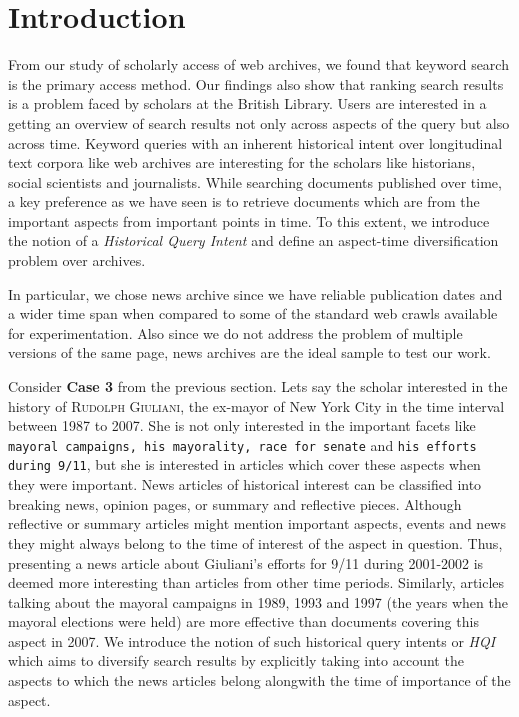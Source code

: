 \section{Introduction}


From our study of scholarly access of web archives, we found that keyword search is the primary access method. Our findings also show that ranking search results is a problem faced by scholars at the British Library. Users are interested in a getting an overview of search results not only across aspects of the query but also across time. Keyword queries with an inherent historical intent over longitudinal text corpora like web archives are interesting for the scholars like historians, social scientists and journalists. While searching documents published over time, a key preference as we have seen is to retrieve documents which are from the important aspects from important points in time. To this extent, we introduce the notion of a \emph{Historical Query Intent} and define an aspect-time diversification problem over archives. 

In particular, we chose news archive since we have reliable publication dates and a wider time span when compared to some of the standard web crawls available for experimentation. Also since we do not address the problem of multiple versions of the same page, news archives are the ideal sample to test our work.

Consider \textbf{Case 3} from the previous section. Lets say the scholar interested in the history of \textsc{Rudolph Giuliani}, the ex-mayor of New York City in the time interval between 1987 to 2007. She is not only interested in the important facets like \texttt{mayoral campaigns, his mayorality, race for senate} and \texttt{his efforts during 9/11}, but she is interested in articles which cover these aspects when they were important. News articles of historical interest can be classified into breaking news, opinion pages, or summary and reflective pieces. Although reflective or summary articles might mention important aspects, events and news they might always belong to the time of interest of the aspect in question. Thus, presenting a news article about Giuliani's efforts for 9/11 during 2001-2002 is deemed more interesting than articles from other time periods. Similarly, articles talking about the mayoral campaigns in 1989, 1993 and 1997 (the years when the mayoral elections were held) are more effective than documents covering this aspect in 2007. We introduce the notion of such historical query intents or \emph{HQI} which aims to diversify search results by explicitly taking into account the aspects to which the news articles belong alongwith the time of importance of the aspect.

